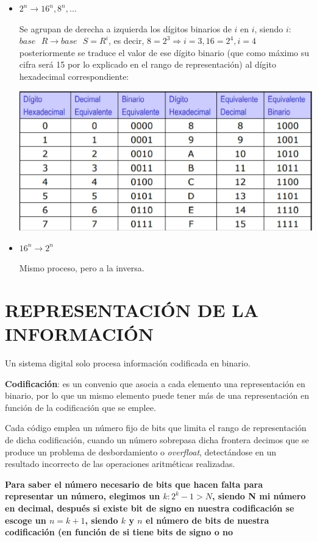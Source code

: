 \documentclass[a4paper,10pt]{book}
\begin{document}
\begin{itemize}
\item $2^n\rightarrow 16^n, 8^n,...$\par
Se agrupan de derecha a izquierda los dígitos binarios de $i$ en $i$, siendo $i$: $base\mbox{ }R \rightarrow base\mbox{ }S=R^{i}$, es decir, $8=2^3\Rightarrow i=3, 16=2^4, i=4$ posteriormente se traduce el valor de ese dígito binario (que como máximo su cifra será 15 por lo explicado en el rango de representación) al dígito hexadecimal correspondiente:

\begin{center}
\includegraphics[scale=0.37]{correspondencia entre bin, dec y hex}
\end{center}

\item $16^n\rightarrow 2^n$\par
Mismo proceso, pero a la inversa.
\end{itemize}
\vspace{0.05cm}
\section*{REPRESENTACIÓN DE LA INFORMACIÓN}
Un sistema digital solo procesa información codificada en binario.\par
\textbf{Codificación}: es un convenio que asocia a cada elemento una representación en binario, por lo que un mismo elemento puede tener más de una representación en función de la codificación que se emplee.\par
Cada código emplea un número fijo de bits que limita el rango de representación de dicha codificación, cuando un número sobrepasa dicha frontera decimos que se produce un problema de desbordamiento o \textit{overfloat}, detectándose en un resultado incorrecto de las operaciones aritméticas realizadas.\par
\textbf{Para saber el número necesario de bits que hacen falta para representar un número, elegimos un $k:2^k-1>N$, siendo N mi número en decimal, después si existe bit de signo en nuestra codificación se escoge un $n=k+1$, siendo $k$ y $n$ el número de bits de nuestra codificación (en función de si tiene bits de signo o no}
\end{document}
